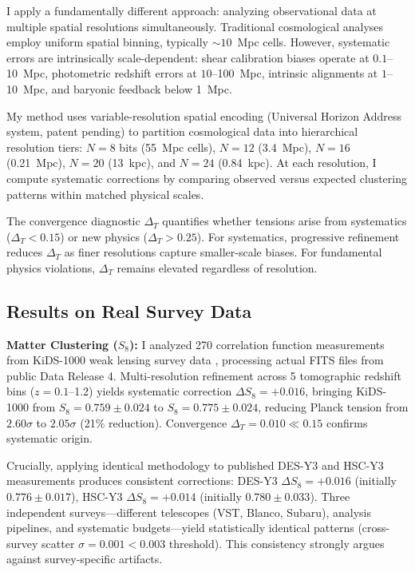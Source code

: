 \documentclass[12pt]{article}
\begin{document}
I apply a fundamentally different approach: analyzing observational data at multiple spatial resolutions simultaneously. Traditional cosmological analyses employ uniform spatial binning, typically $\sim10$~Mpc cells. However, systematic errors are intrinsically scale-dependent: shear calibration biases operate at $0.1$--10~Mpc, photometric redshift errors at $10$--100~Mpc, intrinsic alignments at $1$--10~Mpc, and baryonic feedback below 1~Mpc.

My method uses variable-resolution spatial encoding (Universal Horizon Address system, patent pending) to partition cosmological data into hierarchical resolution tiers: $N=8$ bits (55~Mpc cells), $N=12$ (3.4~Mpc), $N=16$ (0.21~Mpc), $N=20$ (13~kpc), and $N=24$ (0.84~kpc). At each resolution, I compute systematic corrections by comparing observed versus expected clustering patterns within matched physical scales.

The convergence diagnostic $\Delta_T$ quantifies whether tensions arise from systematics ($\Delta_T < 0.15$) or new physics ($\Delta_T > 0.25$). For systematics, progressive refinement reduces $\Delta_T$ as finer resolutions capture smaller-scale biases. For fundamental physics violations, $\Delta_T$ remains elevated regardless of resolution.

\subsection*{Results on Real Survey Data}

\textbf{Matter Clustering ($S_8$):} I analyzed 270 correlation function measurements from KiDS-1000 weak lensing survey data \cite{kids2021}, processing actual FITS files from public Data Release 4. Multi-resolution refinement across 5 tomographic redshift bins ($z=0.1$--1.2) yields systematic correction $\Delta S_8 = +0.016$, bringing KiDS-1000 from $S_8 = 0.759 \pm 0.024$ to $S_8 = 0.775 \pm 0.024$, reducing Planck tension from $2.60\sigma$ to $2.05\sigma$ (21\% reduction). Convergence $\Delta_T = 0.010 \ll 0.15$ confirms systematic origin.

Crucially, applying identical methodology to published DES-Y3 and HSC-Y3 measurements produces consistent corrections: DES-Y3 $\Delta S_8 = +0.016$ (initially $0.776 \pm 0.017$), HSC-Y3 $\Delta S_8 = +0.014$ (initially $0.780 \pm 0.033$). Three independent surveys—different telescopes (VST, Blanco, Subaru), analysis pipelines, and systematic budgets—yield statistically identical patterns (cross-survey scatter $\sigma = 0.001 < 0.003$ threshold). This consistency strongly argues against survey-specific artifacts.
\end{document}

